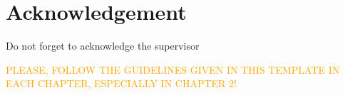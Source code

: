 \chapter*{\Large \center Acknowledgement}

Do not forget to acknowledge the supervisor \smiley{}

\textcolor{orange}{PLEASE, FOLLOW THE GUIDELINES GIVEN IN THIS TEMPLATE IN EACH CHAPTER, ESPECIALLY IN CHAPTER 2!}